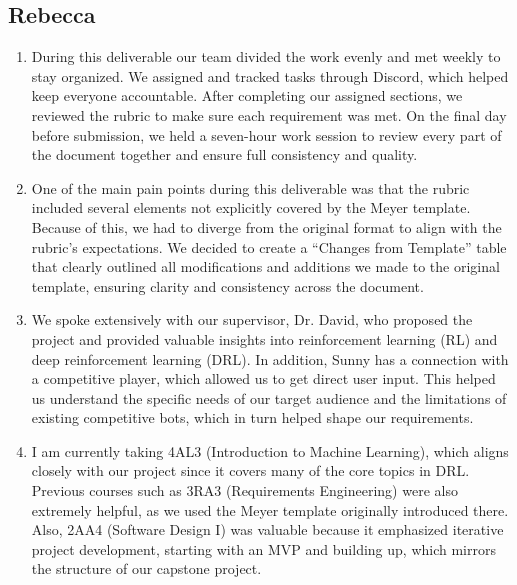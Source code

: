 \documentclass{article}
\begin{document}
\subsection*{Rebecca}\label{subsec:rebecca}
\begin{enumerate}
    \item During this deliverable our team divided the work evenly and met weekly to stay 
    organized. We assigned and tracked tasks through Discord, which 
    helped keep everyone accountable. After completing our assigned
     sections, we reviewed the rubric to make sure each requirement
      was met. On the final day before submission, we held a seven-hour
      work session to review every part of the document together and
       ensure full consistency and quality.

    \item One of the main pain points during this deliverable was that the rubric included
    several elements not explicitly covered by the Meyer template.
     Because of this, we had to diverge from the original format to 
     align with the rubric’s expectations. We decided to create
      a “Changes from Template” table that clearly outlined all modifications and
       additions we made to the original template, ensuring clarity
        and consistency across the document.

    \item We spoke extensively with our supervisor, Dr. David,
     who proposed the project and provided valuable insights into 
     reinforcement learning (RL) and deep reinforcement learning (DRL).
      In addition, Sunny has a connection with a competitive 
      \emph{\Catan{}} player, which allowed us to get direct user input.
      This helped us understand the specific needs of our target audience and the limitations of existing competitive \AI{} bots, which in turn helped shape our requirements.

    \item I am currently taking 4AL3 (Introduction to Machine Learning),
     which aligns closely with our project since it covers many of the
      core topics in DRL. Previous courses such as 3RA3 (Requirements Engineering)
       were also extremely helpful, as we used the Meyer template
        originally introduced there. Also, 2AA4 (Software Design I)
         was valuable because it emphasized iterative project development, starting
          with an MVP and building up, which mirrors the structure of our capstone project.


\end{enumerate}
\end{document}
